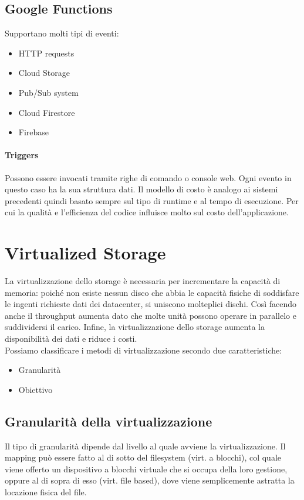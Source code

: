 \documentclass{article}
\begin{document}
		\subsection{Google Functions}
		Supportano molti tipi di eventi:
		\begin{itemize}
		    \item HTTP requests
		    \item Cloud Storage
		    \item Pub/Sub system
		    \item Cloud Firestore
		    \item Firebase
		\end{itemize}
		\paragraph{Triggers}
		Possono essere invocati tramite righe di comando o console web.
		Ogni evento in questo caso ha la sua struttura dati.
		Il modello di costo è analogo ai sistemi precedenti quindi basato sempre sul tipo di runtime e al tempo di esecuzione. Per cui la qualità e l'efficienza del codice influisce molto sul costo dell'applicazione. 
		
		\newpage
		\section{Virtualized Storage}
		La virtualizzazione dello storage è necessaria per incrementare la capacità di memoria: poiché non esiste nessun disco che abbia le capacità fisiche di soddisfare le ingenti richieste dati dei datacenter, si uniscono molteplici dischi. Così facendo anche il throughput aumenta dato che molte unità possono operare in parallelo e suddividersi il carico. Infine, la virtualizzazione dello storage aumenta la disponibilità dei dati e riduce i costi.\\
		Possiamo classificare i metodi di virtualizzazione secondo due caratteristiche:
		\begin{itemize}
		\item Granularità 
		\item Obiettivo
		\end{itemize}
		
		\subsection{Granularità della virtualizzazione}
		Il tipo di granularità dipende dal livello al quale avviene la virtualizzazione. Il mapping può essere fatto al di sotto del filesystem (virt. a blocchi), col quale viene offerto un dispositivo a blocchi virtuale che si occupa della loro gestione, oppure al di sopra di esso (virt. file based), dove viene semplicemente astratta la locazione fisica del file.
		
\end{document}
